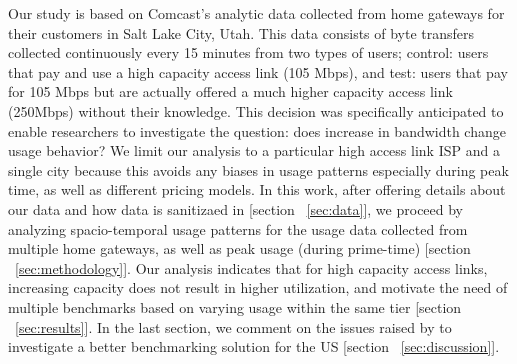 Our study is based on Comcast’s analytic data collected from home gateways for their customers in
Salt Lake City, Utah. This data consists of byte transfers collected continuously every 15 minutes
from two types of users; control: users that pay and use a high capacity access link (105 Mbps), and
test: users that pay for 105 Mbps but are actually offered a much higher capacity access link
(250Mbps) without their knowledge. This decision was specifically anticipated to enable researchers
to investigate the question: does increase in bandwidth change usage behavior? We limit our analysis
to a particular high access link ISP and a single city because this avoids any biases in usage
patterns especially during peak time, as well as different pricing models. 
In this work, after offering details about our data and how data is sanitizaed in [section
~\ref{sec:data}], we proceed by analyzing spacio-temporal usage patterns for the usage data
collected from multiple home gateways, as well as peak usage (during prime-time) [section
~\ref{sec:methodology}]. Our analysis indicates that for high capacity access links, increasing
capacity does not result in higher utilization, and motivate the need of multiple benchmarks based
on varying usage within the same tier [section ~\ref{sec:results}]. In the last section, we comment
on the issues raised by \FCC to investigate a better benchmarking solution for the US [section
~\ref{sec:discussion}].


